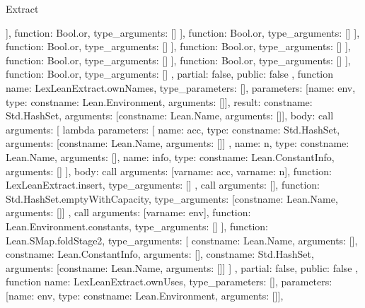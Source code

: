 \begin{lexlean}{Extract}
\begin{toolingmodule}
{{{{{{{{{{{                                    }
                                  ],
                                  function: Bool.or,
                                  type_arguments: []
                                }
                              ],
                              function: Bool.or,
                              type_arguments: []
                            }
                          ],
                          function: Bool.or,
                          type_arguments: []
                        }
                      ],
                      function: Bool.or,
                      type_arguments: []
                    }
                  ],
                  function: Bool.or,
                  type_arguments: []
                }
              ],
              function: Bool.or,
              type_arguments: []
            }
          ],
          function: Bool.or,
          type_arguments: []
        }
      },
      partial: false,
      public: false
    },
    function{
      name: LexLeanExtract.ownNames,
      type_parameters: [],
      parameters: [{name: env, type: const{name: Lean.Environment, arguments: []}}],
      result: const{name: Std.HashSet, arguments: [const{name: Lean.Name, arguments: []}]},
      body: call{
        arguments: [
          lambda{
            parameters: [
              {
                name: acc,
                type: const{name: Std.HashSet, arguments: [const{name: Lean.Name, arguments: []}]}
              },
              {name: n, type: const{name: Lean.Name, arguments: []}},
              {name: info, type: const{name: Lean.ConstantInfo, arguments: []}}
            ],
            body: call{
              arguments: [var{name: acc}, var{name: n}],
              function: LexLeanExtract.insert,
              type_arguments: []
            }
          },
          call{
            arguments: [],
            function: Std.HashSet.emptyWithCapacity,
            type_arguments: [const{name: Lean.Name, arguments: []}]
          },
          call{
            arguments: [var{name: env}],
            function: Lean.Environment.constants,
            type_arguments: []
          }
        ],
        function: Lean.SMap.foldStage2,
        type_arguments: [
          const{name: Lean.Name, arguments: []},
          const{name: Lean.ConstantInfo, arguments: []},
          const{name: Std.HashSet, arguments: [const{name: Lean.Name, arguments: []}]}
        ]
      },
      partial: false,
      public: false
    },
    function{
      name: LexLeanExtract.ownUses,
      type_parameters: [],
      parameters: [{name: env, type: const{name: Lean.Environment, arguments: []}}],
}}
\end{toolingmodule}
\end{lexlean}
